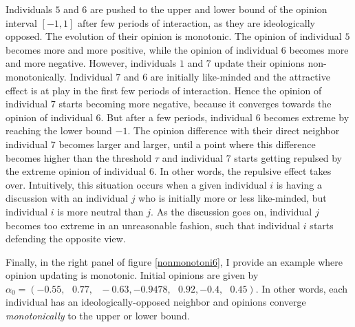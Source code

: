 \documentclass{article}
\begin{document}
Individuals $5$ and $6$ are pushed to the upper and lower bound of the opinion interval $[-1,1]$ after few periods of interaction, as they are ideologically opposed. The evolution of their opinion is monotonic. The opinion of individual $5$ becomes more and more positive, while the opinion of individual $6$ becomes more and more negative. However, individuals $1$ and $7$ update their opinions non-monotonically. Individual $7$ and $6$ are initially like-minded and the attractive effect is at play in the first few periods of interaction. Hence the opinion of individual $7$ starts becoming more negative, because it converges towards the opinion of individual $6$. But after a few periods, individual $6$ becomes extreme by reaching the lower bound $-1$. The opinion difference with their direct neighbor individual $7$ becomes larger and larger, until a point where this difference becomes higher than the threshold $\tau$ and individual $7$ starts getting repulsed by the extreme opinion of individual $6$. In other words, the repulsive effect takes over. Intuitively, this situation occurs when a given individual $i$ is having a discussion with an individual $j$ who is initially more or less like-minded, but individual $i$ is more neutral than $j$. As the discussion goes on, individual $j$ becomes too extreme in an unreasonable fashion, such that individual $i$ starts defending the opposite view.

Finally, in the right panel of figure \ref{nonmonotoni6}, I provide an example where opinion updating is monotonic. Initial opinions are given by $\alpha_{0}=(   -0.55 ,\mbox{ } 0.77 ,\mbox{ }-0.63 ,  -0.9478 , \mbox{ }0.92 , -0.4 , \mbox{ }0.45)$. In other words, each individual has an ideologically-opposed neighbor and opinions converge \textit{monotonically} to the upper or lower bound. 
\end{document}
